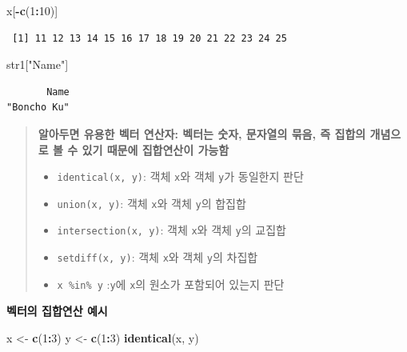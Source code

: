 \documentclass[11pt,a4paper]{book}
\newenvironment{Shaded}{\begin{snugshade}}{\end{snugshade}}
\newcommand{\KeywordTok}[1]{\textcolor[rgb]{0.13,0.29,0.53}{\textbf{#1}}}
\newcommand{\DecValTok}[1]{\textcolor[rgb]{0.00,0.00,0.81}{#1}}
\newcommand{\StringTok}[1]{\textcolor[rgb]{0.31,0.60,0.02}{#1}}
\newcommand{\OperatorTok}[1]{\textcolor[rgb]{0.81,0.36,0.00}{\textbf{#1}}}
\newcommand{\NormalTok}[1]{#1}
\theoremstyle{definition}
\theoremstyle{definition}
\theoremstyle{definition}
\theoremstyle{remark}
\begin{document}
\begin{Shaded}
\begin{Highlighting}[]
\NormalTok{x[}\OperatorTok{-}\KeywordTok{c}\NormalTok{(}\DecValTok{1}\OperatorTok{:}\DecValTok{10}\NormalTok{)]}
\end{Highlighting}
\end{Shaded}

\begin{verbatim}
 [1] 11 12 13 14 15 16 17 18 19 20 21 22 23 24 25
\end{verbatim}

\begin{Shaded}
\begin{Highlighting}[]
\NormalTok{str1[}\StringTok{"Name"}\NormalTok{]}
\end{Highlighting}
\end{Shaded}

\begin{verbatim}
       Name 
"Boncho Ku" 
\end{verbatim}

\normalsize

\begin{quote}
\colorbox{gray!10}{\begin{minipage}{15cm}
\textbf{알아두면 유용한 벡터 연산자: 벡터는 숫자, 문자열의 묶음, 즉 집합의 개념으로 볼 수 있기 때문에 집합연산이 가능함}
\begin{itemize}
  \item \texttt{identical(x, y)}: 객체 \texttt{x}와 객체 \texttt{y}가 동일한지 판단
  \item \texttt{union(x, y)}: 객체 \texttt{x}와 객체 \texttt{y}의 합집합
  \item \texttt{intersection(x, y)}: 객체 \texttt{x}와 객체 \texttt{y}의 교집합
  \item \texttt{setdiff(x, y)}: 객체 \texttt{x}와 객체 \texttt{y}의 차집합
  \item \texttt{x \%in\% y} :\texttt{y}에 \texttt{x}의 원소가 포함되어 있는지 판단
\end{itemize}
\end{minipage}}
\end{quote}

\vspace{0.5cm} \textbf{벡터의 집합연산 예시}

\footnotesize

\begin{Shaded}
\begin{Highlighting}[]
\NormalTok{x <-}\StringTok{ }\KeywordTok{c}\NormalTok{(}\DecValTok{1}\OperatorTok{:}\DecValTok{3}\NormalTok{)}
\NormalTok{y <-}\StringTok{ }\KeywordTok{c}\NormalTok{(}\DecValTok{1}\OperatorTok{:}\DecValTok{3}\NormalTok{)}
\KeywordTok{identical}\NormalTok{(x, y)}
\end{Highlighting}
\end{Shaded}
\end{document}
